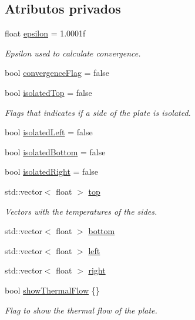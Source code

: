 \subsection*{Atributos privados}
\begin{DoxyCompactItemize}
\item 
float \hyperlink{classanpi_1_1ThermalPlate_a9435460d599abe8ed8e179e80f67ec99}{epsilon} = 1.\+0001f
\begin{DoxyCompactList}\small\item\em Epsilon used to calculate convergence. \end{DoxyCompactList}\item 
bool \hyperlink{classanpi_1_1ThermalPlate_a39f11113f008b3aac37b4be610f83393}{convergence\+Flag} = false
\item 
bool \hyperlink{classanpi_1_1ThermalPlate_ac592cd574059aedf1eb2cb27e626b51a}{isolated\+Top} = false
\begin{DoxyCompactList}\small\item\em Flags that indicates if a side of the plate is isolated. \end{DoxyCompactList}\item 
bool \hyperlink{classanpi_1_1ThermalPlate_adbf8ddb9cecdf113e73107400836faf5}{isolated\+Left} = false
\item 
bool \hyperlink{classanpi_1_1ThermalPlate_af4a6a4bdaecee9a414226d08a9ef1a72}{isolated\+Bottom} = false
\item 
bool \hyperlink{classanpi_1_1ThermalPlate_ace940ae1c50cc8dfff9f2e715a7646b5}{isolated\+Right} = false
\item 
std\+::vector$<$ float $>$ \hyperlink{classanpi_1_1ThermalPlate_af33d6fdc473b7c702a170219add449f0}{top}
\begin{DoxyCompactList}\small\item\em Vectors with the temperatures of the sides. \end{DoxyCompactList}\item 
std\+::vector$<$ float $>$ \hyperlink{classanpi_1_1ThermalPlate_a0ab76c4f095790d763aa7d1eadbde70c}{bottom}
\item 
std\+::vector$<$ float $>$ \hyperlink{classanpi_1_1ThermalPlate_ab0a7fdc0fa86b01ea917291940de2c5e}{left}
\item 
std\+::vector$<$ float $>$ \hyperlink{classanpi_1_1ThermalPlate_acc521430da00ad61b016ddb4300462d3}{right}
\item 
bool \hyperlink{classanpi_1_1ThermalPlate_a71037bf9aaa9f0ea7098a0ff635a186e}{show\+Thermal\+Flow} \{\}
\begin{DoxyCompactList}\small\item\em Flag to show the thermal flow of the plate. \end{DoxyCompactList}\item 

\end{DoxyCompactItemize}
